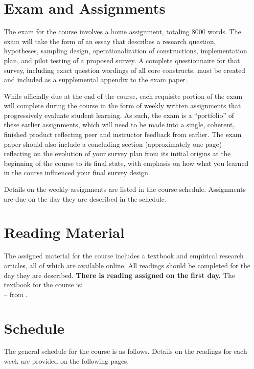 \documentclass[12pt,a4paper]{article}
\newcommand{\reading}[2][]{\noindent --{#1} from \bibentry{#2}.\vspace{.25em}\\}
\begin{document}
\section{Exam and Assignments}
The exam for the course involves a home assignment, totaling 8000 words. The exam will take the form of an essay that describes a research question, hypotheses, sampling design, operationalization of constructions, implementation plan, and pilot testing of a proposed survey. A complete questionnaire for that survey, including exact question wordings of all core constructs, must be created and included as a supplemental appendix to the exam paper.

While officially due at the end of the course, each requisite portion of the exam will complete during the course in the form of weekly written assignments that progressively evaluate student learning. As such, the exam is a ``portfolio'' of these earlier assignments, which will need to be made into a single, coherent, finished product reflecting peer and instructor feedback from earlier. The exam paper should also include a concluding section (approximately one page) reflecting on the evolution of your survey plan from its initial origins at the beginning of the course to its final state, with emphasis on how what you learned in the course influenced your final survey design.

Details on the weekly assignments are listed in the course schedule. Assignments are due on the day they are described in the schedule.



\section{Reading Material}
The assigned material for the course includes a textbook and empirical research articles, all of which are available online. All readings should be completed for the day they are described. \textbf{There is reading assigned on the first day.} The textbook for the course is:\\

\reading{Grovesetal2004}

\clearpage
\section{Schedule}
The general schedule for the course is as follows. Details on the readings for each week are provided on the following pages.
\end{document}
